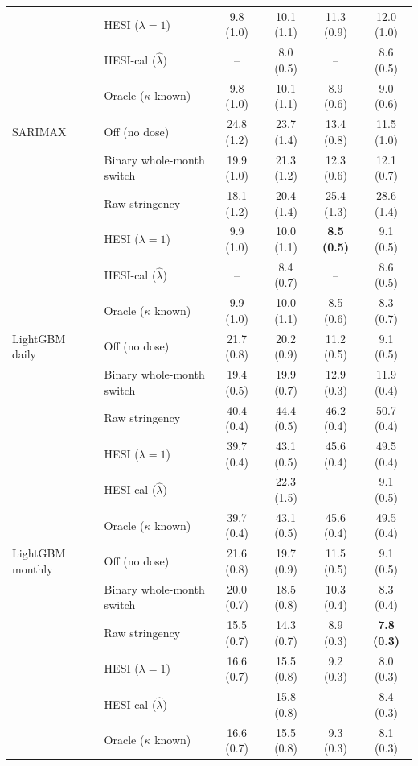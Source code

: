 \documentclass{article}
\theoremstyle{plain}
\theoremstyle{definition}
\theoremstyle{remark}
\begin{document}
\begin{table}[!tb]
\begin{tabular}{llcccc}
 & HESI ($\lambda=1$) & 9.8 (1.0) & 10.1 (1.1) & 11.3 (0.9) & 12.0 (1.0) \\
 & HESI-cal ($\hat\lambda$) & -- & 8.0 (0.5) & -- & 8.6 (0.5) \\
 & Oracle ($\kappa$ known) & 9.8 (1.0) & 10.1 (1.1) & 8.9 (0.6) & 9.0 (0.6) \\
\addlinespace
SARIMAX & Off (no dose) & 24.8 (1.2) & 23.7 (1.4) & 13.4 (0.8) & 11.5 (1.0) \\
 & Binary whole-month switch & 19.9 (1.0) & 21.3 (1.2) & 12.3 (0.6) & 12.1 (0.7) \\
 & Raw stringency & 18.1 (1.2) & 20.4 (1.4) & 25.4 (1.3) & 28.6 (1.4) \\
 & HESI ($\lambda=1$) & 9.9 (1.0) & 10.0 (1.1) & \textbf{8.5 (0.5)} & 9.1 (0.5) \\
 & HESI-cal ($\hat\lambda$) & -- & 8.4 (0.7) & -- & 8.6 (0.5) \\
 & Oracle ($\kappa$ known) & 9.9 (1.0) & 10.0 (1.1) & 8.5 (0.6) & 8.3 (0.7) \\
\addlinespace
LightGBM daily & Off (no dose) & 21.7 (0.8) & 20.2 (0.9) & 11.2 (0.5) & 9.1 (0.5) \\
 & Binary whole-month switch & 19.4 (0.5) & 19.9 (0.7) & 12.9 (0.3) & 11.9 (0.4) \\
 & Raw stringency & 40.4 (0.4) & 44.4 (0.5) & 46.2 (0.4) & 50.7 (0.4) \\
 & HESI ($\lambda=1$) & 39.7 (0.4) & 43.1 (0.5) & 45.6 (0.4) & 49.5 (0.4) \\
 & HESI-cal ($\hat\lambda$) & -- & 22.3 (1.5) & -- & 9.1 (0.5) \\
 & Oracle ($\kappa$ known) & 39.7 (0.4) & 43.1 (0.5) & 45.6 (0.4) & 49.5 (0.4) \\
\addlinespace
LightGBM monthly & Off (no dose) & 21.6 (0.8) & 19.7 (0.9) & 11.5 (0.5) & 9.1 (0.5) \\
 & Binary whole-month switch & 20.0 (0.7) & 18.5 (0.8) & 10.3 (0.4) & 8.3 (0.4) \\
 & Raw stringency & 15.5 (0.7) & 14.3 (0.7) & 8.9 (0.3) & \textbf{7.8 (0.3)} \\
 & HESI ($\lambda=1$) & 16.6 (0.7) & 15.5 (0.8) & 9.2 (0.3) & 8.0 (0.3) \\
 & HESI-cal ($\hat\lambda$) & -- & 15.8 (0.8) & -- & 8.4 (0.3) \\
 & Oracle ($\kappa$ known) & 16.6 (0.7) & 15.5 (0.8) & 9.3 (0.3) & 8.1 (0.3) \\
\bottomrule
\end{tabular}
\end{table}
\end{document}
